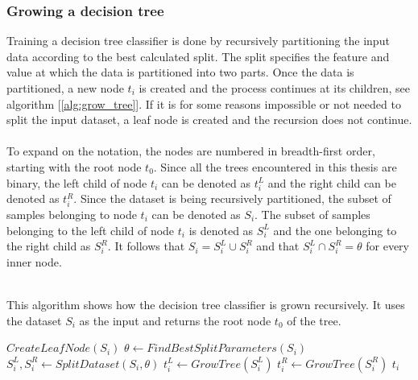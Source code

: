 \documentclass[11pt]{article}
\begin{document}
      \subsubsection{Growing a decision tree}
        Training a decision tree classifier is done by recursively partitioning the input data according to the best calculated split. The split specifies the feature and value at which the data is partitioned into two parts. Once the data is partitioned, a new node $t_i$ is created and the process continues at its children, see algorithm [\ref{alg:grow_tree}]. If it is for some reasons impossible or not needed to split the input dataset, a leaf node is created and the recursion does not continue.\cite{brabec}
        \\~\\
        To expand on the notation, the nodes are numbered in breadth-first order, starting with the root node $t_0$. Since all the trees encountered in this thesis are binary, the left child of node $t_i$ can be denoted as $t_i^L$ and the right child can be denoted as $t_i^R$. Since the dataset is being recursively partitioned, the subset of samples belonging to node $t_i$ can be denoted as $S_i$. The subset of samples belonging to the left child of node $t_i$ is denoted as $S_i^L$ and the one belonging to the right child as $S_i^R$. It follows that $S_i = S_i^L \cup S_i^R$ and that $S_i^L \cap S_i^R = \theta$ for every inner node.\cite{brabec}
        \\~\\
        \begin{algorithm}
          \caption{This algorithm shows how the decision tree classifier is grown recursively. It uses the dataset $S_i$ as the input and returns the root node $t_0$ of the tree.\cite{brabec}}
          \label{alg:grow_tree}
          \begin{algorithmic}[1] %
                \State \Return $CreateLeafNode(S_i)$
              \EndIf
              \State $\theta \gets FindBestSplitParameters(S_i)$
              \State $S_i^L, S_i^R \gets SplitDataset(S_i, \theta)$
              \State $t_i^L \gets GrowTree(S_i^L)$
              \State $t_i^R \gets GrowTree(S_i^R)$
              \State \Return $t_i$
            \EndFunction
          \end{algorithmic}
        \end{algorithm}
\end{document}
